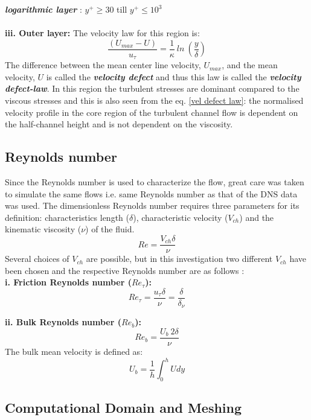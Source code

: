 \emph{\textbf{logarithmic layer}} : $y^+ \geq  30$ till $y^+ \leq  10^3$ \\\\
%
\textbf{iii. Outer layer:} The velocity law for this region is:
\begin{equation}
	\label{vel defect law}
	\frac{\left(U_{max} - U\right)}{u_\tau} = \frac{1}{\kappa}\ ln\ \left(\frac{y}{\delta}\right)  
\end{equation}
The difference between the mean center line velocity, $U_{max}$, and the mean velocity, $U$ is called the \emph{\textbf{velocity defect}} and thus this law is called the \emph{\textbf{velocity defect-law}}. In this region the turbulent stresses are dominant compared to the viscous stresses and this is also seen from the eq. \ref{vel defect law}: the normalised velocity profile in the core region of the turbulent channel flow is dependent on the half-channel height and is not dependent on the viscosity. 

\subsection{Reynolds number}
Since the Reynolds number is used to characterize the flow, great care was taken to simulate the same flows i.e. same Reynolds number as that of the DNS data was used. The dimensionless Reynolds number requires three parameters for its definition: characteristics length ($\delta$), characteristic velocity ($V_{ch}$) and the kinematic viscosity ($\nu$) of the fluid. 
$$ Re = \frac{V_{ch}\delta}{\nu} $$
Several choices of $V_{ch}$ are possible, but in this investigation two different $V_{ch}$ have been chosen and the respective Reynolds number are as follows :\\

\textbf{i. Friction Reynolds number ($Re_\tau$):}\begin{equation}
	\label{friction Re}
	Re_\tau = \frac{u_\tau \delta}{\nu}  = \frac{\delta}{\delta_\nu}  
\end{equation}

\textbf{ii. Bulk Reynolds number ($Re_b$):}\begin{equation}
	\label{bulk Re}
	Re_b = \frac{U_b\ 2\delta}{\nu}
\end{equation}
The bulk mean velocity is defined as:
$$U_b = \frac{1}{h}\int_{0}^h U dy$$

\subsection{Computational Domain and Meshing}
